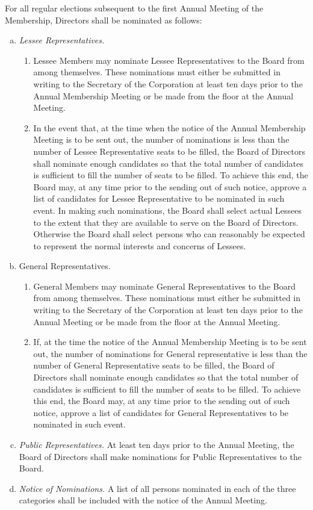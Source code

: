 For all regular elections subsequent to the first Annual Meeting of
the Membership, Directors shall be nominated as follows:
\begin{enumerate}[a.]
\item \emph{Lessee Representatives.}
  \begin{enumerate}[(1)]
  \item Lessee Members may nominate Lessee Representatives to the
    Board from among themselves. These nominations must either be
    submitted in writing to the Secretary of the Corporation at least
    ten days prior to the Annual Membership Meeting or be made from
    the floor at the Annual Meeting.
  \item In the event that, at the time when the notice of the Annual
    Membership Meeting is to be sent out, the number of nominations is
    less than the number of Lessee Representative seats to be filled,
    the Board of Directors shall nominate enough candidates so that
    the total number of candidates is sufficient to fill the number of
    seats to be filled. To achieve this end, the Board may, at any
    time prior to the sending out of such notice, approve a list of
    candidates for Lessee Representative to be nominated in such
    event. In making such nominations, the Board shall select actual
    Lessees to the extent that they are available to serve on the
    Board of Directors. Otherwise the Board shall select persons who
    can reasonably be expected to represent the normal interests and
    concerns of Lessees.
  \end{enumerate}
\item{General Representatives.}
  \begin{enumerate}[(1)]
  \item General Members may nominate General Representatives to the
    Board from among themselves. These nominations must either be
    submitted in writing to the Secretary of the Corporation at least
    ten days prior to the Annual Meeting or be made from the floor at
    the Annual Meeting.
  \item If, at the time the notice of the Annual Membership Meeting is
    to be sent out, the number of nominations for General
    representative is less than the number of General Representative
    seats to be filled, the Board of Directors shall nominate enough
    candidates so that the total number of candidates is sufficient to
    fill the number of seats to be filled. To achieve this end, the
    Board may, at any time prior to the sending out of such notice,
    approve a list of candidates for General Representatives to be
    nominated in such event.
  \end{enumerate}
\item \emph{Public Representatives.}  At least ten days prior to the
  Annual Meeting, the Board of Directors shall make nominations for
  Public Representatives to the Board.
\item \emph{Notice of Nominations.}  A list of all persons nominated
  in each of the three categories shall be included with the notice of
  the Annual Meeting.
\end{enumerate}

